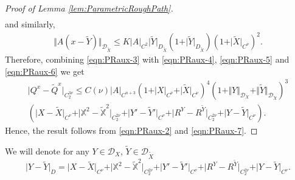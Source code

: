 \documentclass[11pt,a4paper,leqno]{amsart}%
\theoremstyle{plain}
\theoremstyle{remark}
\theoremstyle{plain}
\numberwithin{equation}{section}
\begin{document}
\begin{proof}[ Proof of Lemma \ref{lem:ParametricRoughPath}]
\begin{eqnarray}
\end{eqnarray}
and similarly,
\begin{eqnarray}
\Vert A(x-\tilde{Y})\Vert_{\mathcal{D}_{\tilde{X}}}\leq
K\vert A\vert_{C^2}\vert \tilde{Y}\vert_{D_{\tilde{X}}}(1+\vert \tilde{Y}\vert_{D_{\tilde{X}}})(1+\vert \tilde{X}\vert_{C^{\nu}})^2.\label{eqn:PRaux-6}
\end{eqnarray}
Therefore, combining \eqref{eqn:PRaux-3} with \eqref{eqn:PRaux-4},
\eqref{eqn:PRaux-5} and \eqref{eqn:PRaux-6} we get
\begin{multline}\label{eqn:PRaux-7}
\vert Q^x-\tilde{Q}^x\vert_{C_2^{3\nu}}\leq C(\nu)\vert A\vert_{C^{n+3}}(1+\vert X\vert_{C^{\nu}}+\vert \tilde{X}\vert_{C^{\nu}})^4(1+\Vert Y\Vert_{\mathcal{D}_X}+\Vert \tilde{Y}\Vert_{\mathcal{D}_{\tilde{X}}})^3\\
(\vert X-\tilde{X}\vert_{C^{\nu}}+\vert \mathbb{X}^2-\mathbb{\tilde{X}}^2\vert_{C_2^{2\nu}}+\vert Y'-\tilde{Y}'\vert_{C^{\nu}}+\vert R^Y-R^{\tilde{Y}}\vert_{C_2^{2\nu}}+\vert Y-\tilde{Y}\vert_{C^{\nu}}).
\end{multline}
Hence, the result follows from \eqref{eqn:PRaux-2} and
\eqref{eqn:PRaux-7}.
\end{proof}
We will denote for any $Y\in\mathcal{D}_X$,
$\tilde{Y}\in\mathcal{D}_{\tilde{X}}$
$$
\vert Y-\tilde{Y}\vert_D=\vert X-\tilde{X}\vert_{C^{\nu}}+\vert \mathbb{X}^2-\mathbb{\tilde{X}}^2\vert_{C_2^{2\nu}}+\vert Y'-\tilde{Y}'\vert_{C^{\nu}}+\vert R^Y-R^{\tilde{Y}}\vert_{C_2^{2\nu}}+\vert Y-\tilde{Y}\vert_{C^{\nu}}.
$$
\end{document}
